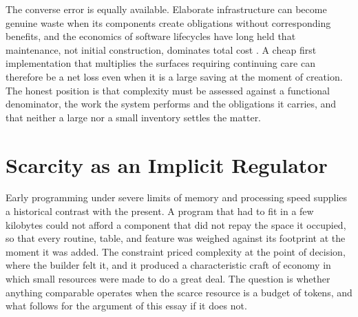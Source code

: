 \documentclass[11pt]{article}
\theoremstyle{remark}
\begin{document}
The converse error is equally available. Elaborate infrastructure can become genuine waste when its components create obligations without corresponding benefits, and the economics of software lifecycles have long held that maintenance, not initial construction, dominates total cost \cite{boehm1981,lehman1980}. A cheap first implementation that multiplies the surfaces requiring continuing care can therefore be a net loss even when it is a large saving at the moment of creation. The honest position is that complexity must be assessed against a functional denominator, the work the system performs and the obligations it carries, and that neither a large nor a small inventory settles the matter.

\section{Scarcity as an Implicit Regulator}

Early programming under severe limits of memory and processing speed supplies a historical contrast with the present. A program that had to fit in a few kilobytes could not afford a component that did not repay the space it occupied, so that every routine, table, and feature was weighed against its footprint at the moment it was added. The constraint priced complexity at the point of decision, where the builder felt it, and it produced a characteristic craft of economy in which small resources were made to do a great deal. The question is whether anything comparable operates when the scarce resource is a budget of tokens, and what follows for the argument of this essay if it does not.
\end{document}
